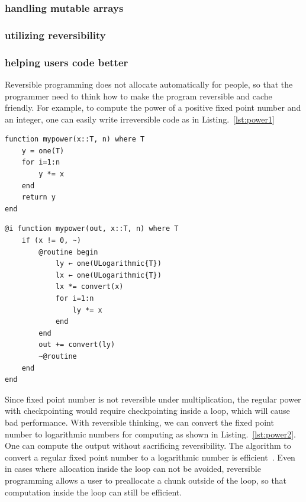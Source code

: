 \documentclass{article}
\newcommand{\<}{\langle}
\renewcommand{\>}{\rangle}
\newcommand{\Lst}[1]{Listing.~\ref{#1}}
\theoremstyle{definition}\newtheorem{definition}{\textit{Definition}}
\begin{document}
\subsubsection{handling mutable arrays}
\subsubsection{utilizing reversibility}
\subsubsection{helping users code better}
Reversible programming does not allocate automatically for people, so that the programmer need to think how to make the program reversible and cache friendly.
For example, to compute the power of a positive fixed point number and an integer, one can easily write irreversible code as in \Lst{lst:power1}

\begin{minipage}{.45\columnwidth}
\begin{lstlisting}[mathescape=true,caption={A regular power function.},label={lst:power1}]
function mypower(x::T, n) where T
    y = one(T)
    for i=1:n
        y *= x
    end
    return y
end
\end{lstlisting}
\end{minipage}\hfill
\begin{minipage}{.45\columnwidth}
\begin{lstlisting}[mathescape=true,caption={A reversible power function.},label={lst:power2}]
@i function mypower(out, x::T, n) where T
    if (x != 0, ~)
        @routine begin
            ly ← one(ULogarithmic{T})
            lx ← one(ULogarithmic{T})
            lx *= convert(x)
            for i=1:n
                ly *= x
            end
        end
        out += convert(ly)
        ~@routine
    end
end
\end{lstlisting}
\end{minipage}

Since fixed point number is not reversible under multiplication, the regular power with checkpointing would require checkpointing inside a loop, which will cause bad performance. With reversible thinking, we can convert the fixed point number to logarithmic numbers for computing as shown in \Lst{lst:power2}. One can compute the output without sacrificing reversibility. The algorithm to convert a regular fixed point number to a logarithmic number is efficient~\cite{Turner2010}.
Even in cases where allocation inside the loop can not be avoided, reversible programming allows a user to preallocate a chunk outside of the loop, so that computation inside the loop can still be efficient.
\end{document}
